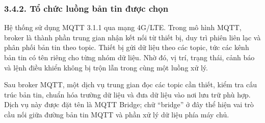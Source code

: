 \documentclass[a4paper]{extarticle}
\begin{document}
\subsubsection{3.4.2. Tổ chức luồng bản tin được chọn}\label{tux1ed5-chux1ee9c-luux1ed3ng-bux1ea3n-tin-ux111ux1b0ux1ee3c-chux1ecdn}

Hệ thống sử dụng MQTT 3.1.1 qua mạng 4G/LTE. Trong mô hình MQTT, broker là thành phần trung gian nhận kết nối từ thiết bị, duy trì phiên liên lạc và phân phối bản tin theo topic. Thiết bị gửi dữ liệu theo các topic, tức các kênh bản tin có tên riêng cho từng nhóm dữ liệu. Nhờ đó, vị trí, trạng thái, cảnh báo và lệnh điều khiển không bị trộn lẫn trong cùng một luồng xử lý.

Sau broker MQTT, một dịch vụ trung gian đọc các topic cần thiết, kiểm tra cấu trúc bản tin, chuẩn hóa trường dữ liệu và đưa dữ liệu vào nơi lưu trữ phù hợp. Dịch vụ này được đặt tên là MQTT Bridge; chữ ``bridge'' ở đây thể hiện vai trò cầu nối giữa đường bản tin MQTT và phần xử lý dữ liệu phía máy chủ.
\end{document}
